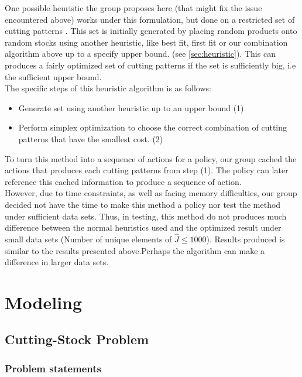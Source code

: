 \documentclass[a4paper]{article}
\begin{document}
    One possible heuristic the group proposes here (that might fix the issue encountered above) works under this formulation, but done on a restricted set of cutting patterns . This set is initially generated by placing random products onto random stocks using another heuristic, like best fit, first fit or our combination algorithm above up to a specify upper bound. (see \ref{sec:heuristic}).
    This can produces a fairly optimized set of cutting patterns if the set  is sufficiently big, i.e the sufficient upper bound.
    \vspace{0.2cm}\\
    The specific steps of this heuristic algorithm is as follows:
    \begin{itemize}
        \item Generate set  using another heuristic up to an upper bound (1)
        \item Perform simplex optimization to choose the correct combination of cutting patterns that have the smallest cost. (2)
    \end{itemize}
    \vspace{0.2cm}
    To turn this method into a sequence of actions for a policy, our group cached the actions that produces each cutting patterns from step (1). The policy can later reference this cached information to produce a sequence of action.
    \vspace{0.2cm}\\
    However, due to time constraints, as well as facing memory difficulties, our group decided not have the time to make this method a policy nor test the method under sufficient data sets. Thus, in testing, this method do not produces much difference between the normal heuristics used and the optimized result under small data sets (Number of unique elements of $ \hat{J} \leqslant 1000$).  Results produced is similar to the results presented above.Perhaps the algorithm can make a difference in larger data sets.
    \pagebreak

    \section{Modeling}
    \subsection{Cutting-Stock Problem}
    \subsubsection{Problem statements}
\end{document}
